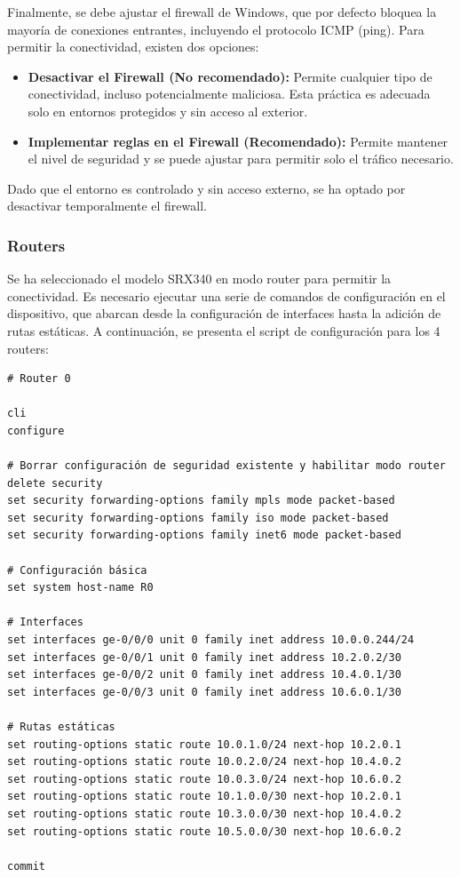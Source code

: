 \documentclass[%
    school=etsisi,%
    degree=61TI,%
]{upm-report}
\begin{document}
Finalmente, se debe ajustar el firewall de Windows, que por defecto bloquea la mayoría de conexiones entrantes, incluyendo el protocolo ICMP (ping). Para permitir la conectividad, existen dos opciones:
\begin{itemize}
    \item \textbf{Desactivar el Firewall (No recomendado):} Permite cualquier tipo de conectividad, incluso potencialmente maliciosa. Esta práctica es adecuada solo en entornos protegidos y sin acceso al exterior.
    \item \textbf{Implementar reglas en el Firewall (Recomendado):} Permite mantener el nivel de seguridad y se puede ajustar para permitir solo el tráfico necesario.
\end{itemize}

Dado que el entorno es controlado y sin acceso externo, se ha optado por desactivar temporalmente el firewall.

\subsubsection{Routers}

Se ha seleccionado el modelo SRX340 en modo router para permitir la conectividad. Es necesario ejecutar una serie de comandos de configuración en el dispositivo, que abarcan desde la configuración de interfaces hasta la adición de rutas estáticas. A continuación, se presenta el script de configuración para los 4 routers:

\begin{lstlisting}[breaklines]
# Router 0

cli
configure

# Borrar configuración de seguridad existente y habilitar modo router
delete security
set security forwarding-options family mpls mode packet-based
set security forwarding-options family iso mode packet-based
set security forwarding-options family inet6 mode packet-based

# Configuración básica
set system host-name R0

# Interfaces
set interfaces ge-0/0/0 unit 0 family inet address 10.0.0.244/24
set interfaces ge-0/0/1 unit 0 family inet address 10.2.0.2/30
set interfaces ge-0/0/2 unit 0 family inet address 10.4.0.1/30
set interfaces ge-0/0/3 unit 0 family inet address 10.6.0.1/30

# Rutas estáticas
set routing-options static route 10.0.1.0/24 next-hop 10.2.0.1
set routing-options static route 10.0.2.0/24 next-hop 10.4.0.2
set routing-options static route 10.0.3.0/24 next-hop 10.6.0.2
set routing-options static route 10.1.0.0/30 next-hop 10.2.0.1
set routing-options static route 10.3.0.0/30 next-hop 10.4.0.2
set routing-options static route 10.5.0.0/30 next-hop 10.6.0.2

commit
\end{lstlisting}
\end{document}
